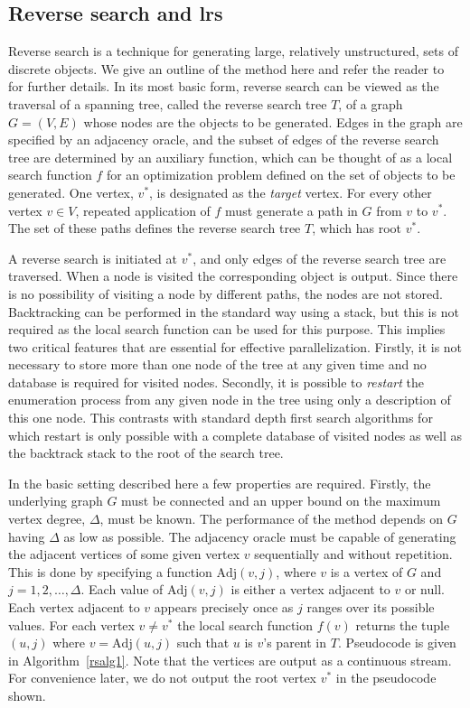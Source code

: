 \documentclass[a4paper,11pt]{article}   \usepackage{authblk} \usepackage[top=1.9cm,bottom=1.9cm,left=1.9cm,right=1.9cm]{geometry}
\newcommand{\progname}{\textsf}
\newcommand{\lrs}{\progname{lrs}\xspace}
\newcommand{\Adj}{\textrm{Adj}}
\begin{document}
\subsection{Reverse search and \lrs}
\label{sec:lrs}

Reverse search is a technique for generating large, relatively unstructured, sets of discrete
objects. We give an outline of the method here and refer the reader to~\cite{AF92,AF93}
for further details.
In its most basic form, reverse search can be viewed as the traversal of a spanning tree, called the reverse
search tree $T$, of a graph $G=(V,E)$ whose nodes are the objects to be generated. Edges in the graph are
specified by an adjacency oracle, and the subset of edges of the reverse search tree are
determined by an auxiliary function, which can be thought of as a local search function $f$ for an
optimization problem defined on the set of objects to be generated. One vertex, $v^*$, is designated
as the \emph{target} vertex. For every other vertex $v\in V$,
repeated application of $f$ must generate a
path in $G$ from $v$ to $v^*$. The set of these paths defines the reverse search tree $T$, which has root $v^*$.

A reverse search is initiated at $v^*$, and only edges of the reverse search tree are traversed.
When a node is visited the corresponding object is output.  Since there is no possibility of
visiting a node by different paths, the nodes are not stored.  Backtracking can be performed in the
standard way using a stack, but this is not required as the local search function can be used for
this purpose. This implies two critical features that are essential for effective parallelization.
Firstly, it is not necessary to store more than one node of the tree at any
given time and no database is required for visited nodes. 
Secondly, it is possible to \emph{restart} the enumeration process from
any given node in the tree using only a description of this one node.
This contrasts with standard depth first search algorithms for which restart
is only possible with a complete database of visited nodes as well as the backtrack stack
to the root of the search tree.

In the basic setting described here a few properties are required. Firstly, the
underlying graph $G$ must be connected and an upper bound on the maximum vertex degree, $\Delta$, must
be known.  The performance of the method depends on $G$ having $\Delta$ as low as
possible.  The adjacency oracle must be capable of generating the adjacent vertices of some given
vertex $v$ sequentially and without repetition.  This is done by specifying a function  
$\Adj(v,j)$, where $v$ is a vertex of $G$ and $j = 1,2,\ldots,\Delta$.  Each value of $\Adj(v, j)$ is
either a vertex adjacent to $v$ or null. Each vertex adjacent to $v$ appears precisely once as $j$ ranges
over its possible values.  For each vertex $v \neq v^*$
the local search function $f(v)$ returns the tuple $(u,j)$ where $v = \Adj(u,j)$ such that $u$
is $v$'s parent in $T$.
Pseudocode is given in Algorithm~\ref{rsalg1}.
Note that the vertices are output as a continuous stream.
For convenience later, we do not output the root vertex $v^*$ in the pseudocode shown.
\end{document}
